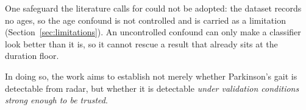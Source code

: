 \noindent One safeguard the literature calls for could not be adopted: the
dataset records no ages, so the age confound is not controlled and is carried
as a limitation (Section~\ref{sec:limitations}). An uncontrolled confound can
only make a classifier look better than it is, so it cannot rescue a result
that already sits at the duration floor.

\noindent In doing so, the work aims to establish not merely whether Parkinson's
gait is detectable from radar, but whether it is detectable \emph{under
validation conditions strong enough to be trusted}.
